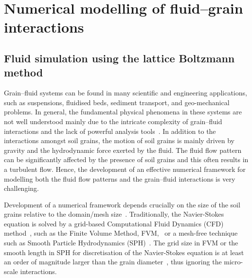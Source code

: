 \chapter{Numerical modelling of fluid–grain interactions}

\ifpdf
    \graphicspath{{Chapter5/figs/raster/}{Chapter5/figs/pdf/}{Chapter5/figs/}}
\else
    \graphicspath{{Chapter5/figs/vector/}{Chapter5/figs/}}
\fi


\section{Fluid simulation using the lattice Boltzmann method}

Grain--fluid systems can be found in many scientific and engineering 
applications, such as suspensions, fluidised beds, sediment transport, and 
geo-mechanical problems. In general, the fundamental physical phenomena in 
these systems are not well understood mainly due to the intricate complexity of 
grain--fluid interactions and the lack of powerful analysis 
tools~\citep{Han2007b}. In addition to the interactions amongst soil grains, 
the motion of soil grains is mainly driven by gravity and the hydrodynamic 
force exerted by the fluid. The fluid flow pattern can be significantly 
affected by the presence of soil grains and this often results in a turbulent 
flow. Hence, the development of an effective numerical framework for modelling 
both the fluid flow patterns and the grain--fluid interactions is very 
challenging.

Development of a numerical framework depends crucially on the size of the soil 
grains relative to the domain/mesh size~\citep{Feng2007}. Traditionally, the 
Navier-Stokes equation is solved by a grid-based Computational Fluid Dynamics 
(CFD) method~\citep{Tsuji2007}, such as the Finite Volume Method, 
FVM,~\citep{Capecelatro2013} or a mesh-free technique such as Smooth Particle 
Hydrodynamics (SPH)~\citep{Sun2013}. The grid size in FVM or the smooth length 
in SPH for discretisation of the Navier-Stokes equation is at least an order of 
magnitude larger than the grain diameter~\citep{Xiong2014}, thus ignoring the 
micro-scale interactions. 

